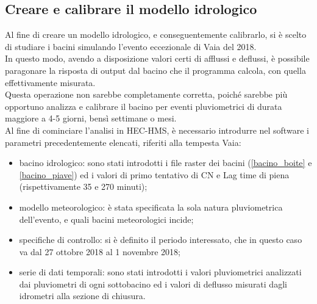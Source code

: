 \subsection{Creare e calibrare il modello idrologico}
Al fine di creare un modello idrologico, e conseguentemente calibrarlo, si è scelto di studiare i bacini simulando l'evento eccezionale di Vaia del 2018.\\
In questo modo, avendo a disposizione valori certi di afflussi e deflussi, è possibile paragonare la risposta di output dal bacino che il programma calcola, con quella effettivamente misurata.\\
Questa operazione non sarebbe completamente corretta, poiché sarebbe più opportuno analizza e calibrare il bacino per eventi pluviometrici di durata maggiore a 4-5 giorni, bensì settimane o mesi.\\
Al fine di cominciare l'analisi in HEC-HMS, è necessario introdurre nel software i parametri precedentemente elencati, riferiti alla tempesta Vaia:
\begin{itemize}
    \item bacino idrologico: sono stati introdotti i file raster dei bacini (\ref{bacino_boite} e \ref{bacino_piave}) ed i valori di primo tentativo di CN e Lag time di piena (rispettivamente 35 e 270 minuti);
    \item modello meteorologico: è stata specificata la sola natura pluviometrica dell'evento, e quali bacini meteorologici incide;
    \item specifiche di controllo: si è definito il periodo interessato, che in questo caso va dal 27 ottobre 2018 al 1 novembre 2018;
    \item serie di dati temporali: sono stati introdotti i valori pluviometrici analizzati dai pluviometri di ogni sottobacino ed i valori di deflusso misurati dagli idrometri alla sezione di chiusura.
\end{itemize}

